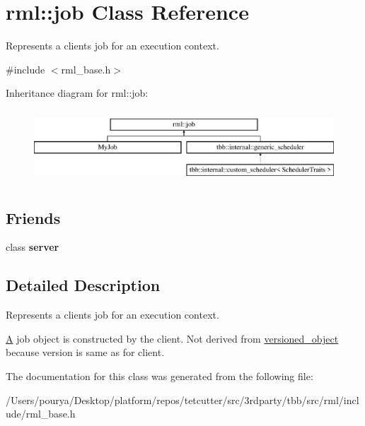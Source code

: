 \hypertarget{classrml_1_1job}{}\section{rml\+:\+:job Class Reference}
\label{classrml_1_1job}


Represents a client\textquotesingle{}s job for an execution context.  




{\ttfamily \#include $<$rml\+\_\+base.\+h$>$}

Inheritance diagram for rml\+:\+:job\+:\begin{figure}[H]
\begin{center}
\leavevmode
\includegraphics[height=2.745098cm]{classrml_1_1job}
\end{center}
\end{figure}
\subsection*{Friends}
\begin{DoxyCompactItemize}
\item 
\hypertarget{classrml_1_1job_a8bf6e2cf871b0a2131f73727ffbf94cb}{}class {\bfseries server}\label{classrml_1_1job_a8bf6e2cf871b0a2131f73727ffbf94cb}

\end{DoxyCompactItemize}


\subsection{Detailed Description}
Represents a client\textquotesingle{}s job for an execution context. 

\hyperlink{structA}{A} job object is constructed by the client. Not derived from \hyperlink{classrml_1_1versioned__object}{versioned\+\_\+object} because version is same as for client. 

The documentation for this class was generated from the following file\+:\begin{DoxyCompactItemize}
\item 
/\+Users/pourya/\+Desktop/platform/repos/tetcutter/src/3rdparty/tbb/src/rml/include/rml\+\_\+base.\+h\end{DoxyCompactItemize}
